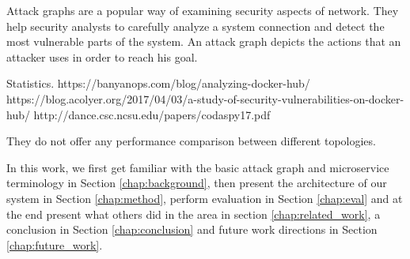 

Attack graphs are a popular way of examining security aspects of network. They help security analysts to carefully analyze a system connection and detect the most vulnerable parts of the system. An attack graph depicts the actions that an attacker uses in order to reach his goal.  

Statistics. 
https://banyanops.com/blog/analyzing-docker-hub/
https://blog.acolyer.org/2017/04/03/a-study-of-security-vulnerabilities-on-docker-hub/
http://dance.csc.ncsu.edu/papers/codaspy17.pdf \cite{shu2017study}

They do not offer any performance comparison between different topologies. 

In this work, we first get familiar with the basic attack graph and microservice terminology in Section \ref{chap:background}, then present the architecture of our system in Section \ref{chap:method}, perform evaluation in Section \ref{chap:eval} and at the end present what others did in the area in section \ref{chap:related_work}, a conclusion in Section \ref{chap:conclusion} and future work directions in Section \ref{chap:future_work}.

